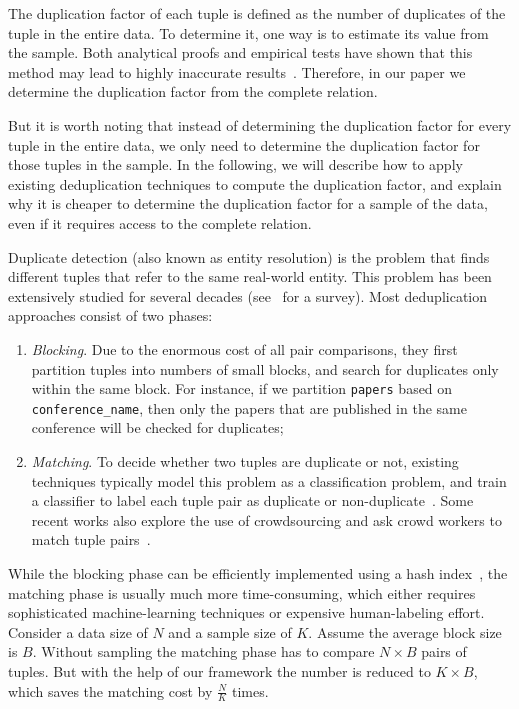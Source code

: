 The duplication factor of each tuple is defined as the number of duplicates of the tuple in the entire data. To determine it, one way is to estimate its value from the sample. Both analytical proofs and empirical tests have shown that this method may lead to highly inaccurate results~\cite{charikar2000towards}.
Therefore, in our paper we determine the duplication factor from the complete relation. 

But it is worth noting that instead of determining the duplication factor for every tuple in the entire data, we only need to determine the duplication factor for those tuples in the sample. 
In the following, we will describe how to apply existing deduplication techniques to compute the duplication factor, and explain why it is cheaper to determine the duplication factor for a sample of the data, even if it requires access to the complete relation.


Duplicate detection (also known as entity resolution) is the problem that finds different tuples that refer to the same real-world entity. This problem has been extensively studied for several decades (see~\cite{DBLP:journals/tkde/ElmagarmidIV07} for a survey).  
Most deduplication approaches consist of two phases: 
\begin{enumerate}\vspace{-.25em}
\item \emph{Blocking}. 
Due to the enormous cost of all pair comparisons, they first partition tuples into numbers of small blocks, and search for duplicates only within the same block. 
For instance, if we partition \texttt{papers} based on \texttt{conference\_name}, then only the papers that are published in the same conference will be checked for duplicates; \vspace{-.25em}
\item \emph{Matching}. 
To decide whether two tuples are duplicate or not, existing techniques typically model this problem as a classification problem, and train a classifier to label each tuple pair as duplicate or non-duplicate~\cite{DBLP:conf/kdd/BilenkoM03}. 
Some recent works also explore the use of crowdsourcing and ask crowd workers to match tuple pairs~\cite{DBLP:journals/pvldb/WangKFF12,DBLP:conf/www/DemartiniDC12}.
\end{enumerate}\vspace{-.25em}
While the blocking phase can be efficiently implemented using a hash index~\cite{journals/tkde/Christen11}, the matching phase is usually much more time-consuming, which either requires sophisticated machine-learning techniques or expensive human-labeling effort. %
Consider a data size of $N$ and a sample size of $K$. Assume the average block size is $B$. Without sampling the matching phase has to compare $N\times B$ pairs of tuples. But with the help of our framework the number is reduced to $K\times B$, which saves the matching cost by $\frac{N}{K}$ times. 


